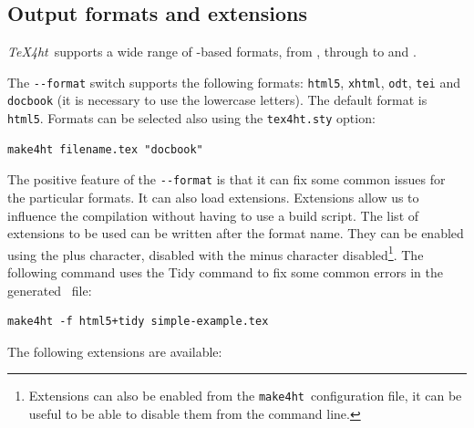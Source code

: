 \documentclass{ltugproc}
\newcommand\term[1]{\textit{#1}}
\newcommand\command[1]{\texttt{#1}}
\newcommand\packagename[1]{\texttt{#1.sty}}
\newcommand\texfourht{\term{\TeX4ht}}
\newcommand\makefourht{\command{make4ht}}
\newcommand\switch[1]{\texttt{-\/-#1}}
\begin{document}
\subsection{Output formats and extensions}

\texfourht\ supports a wide range of \XML-based formats, from , through  to
 and . 

The \switch{format} switch supports the following formats: \command{html5}, \command{xhtml}, \command{odt}, \command{tei} and \command{docbook} (it is necessary to use the lowercase letters). 
The default format is \command{html5}. Formats can be selected also using the \packagename{tex4ht} option:

\begin{verbatim}
make4ht filename.tex "docbook"
\end{verbatim}

The positive feature of the \switch{format} is that it can fix some common issues for the particular formats. 
It can also load extensions. Extensions allow us to influence the compilation
without having to use a build script. The list of extensions to be used can be
written after the format name. They can be  enabled using the plus character,
disabled with the minus character disabled\footnote{Extensions can also be
enabled from the \makefourht\ configuration file, it can be useful to be able
to disable them from  the command line.}. The following command uses the \HTML
Tidy command to fix some common errors in the generated \HTML\ file:


\begin{verbatim}
make4ht -f html5+tidy simple-example.tex
\end{verbatim}

The following extensions are available:

 
\end{document}
